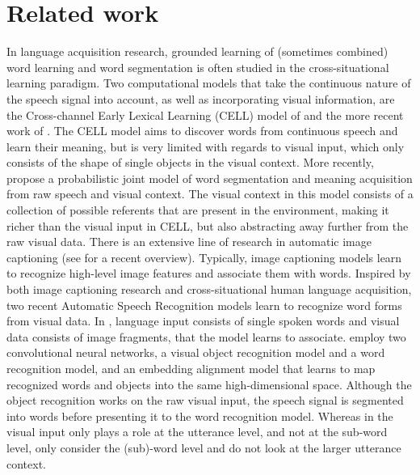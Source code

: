 \section{Related work}

In language acquisition research, grounded learning of (sometimes combined) word learning and word segmentation is often studied in the cross-situational learning paradigm. %
Two computational models that take the continuous nature of the speech signal into account, as well as incorporating visual information, are the Cross-channel Early Lexical Learning (CELL) model of  and the more recent work of . The CELL model aims to discover words from continuous speech and learn their meaning, but is very limited with regards to visual input, which only consists of the shape of single objects in the visual context. More recently,  propose a probabilistic joint model of word segmentation and meaning acquisition from raw speech and visual context. The visual context in this model consists of a collection of possible referents that are present in the environment, making it richer than the visual input in CELL, but also abstracting away further from the raw visual data. 
There is an extensive line of research in automatic image captioning (see  for a recent overview). Typically, image captioning models learn to recognize high-level image features and associate them with words. Inspired by both image captioning research and cross-situational human language acquisition, two recent Automatic Speech Recognition models learn to recognize word forms from visual data. In , language input consists of single spoken words and visual data consists of image fragments, that the model learns to associate.  employ two convolutional neural networks, a visual object recognition model and a word recognition model, and an embedding alignment model that learns to map recognized words and objects into the same high-dimensional space. Although the object recognition works on the raw visual input, the speech signal is segmented into words before presenting it to the word recognition model. Whereas in  the visual input only plays a role at the utterance level, and not at the sub-word level,  only consider the (sub)-word level and do not look at the larger utterance context. 
